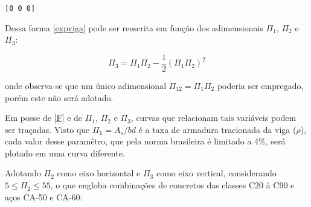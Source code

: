     \begin{Verbatim}[commandchars=\\\{\}]
[0 0 0]
    \end{Verbatim}

    Dessa forma \ref{expviga} pode ser reescrita em função dos adimensionais
\(\Pi_1\), \(\Pi_2\) e \(\Pi_3\):

\begin{equation}
\Pi_3=\Pi_1\Pi_2-\frac{1}{2}(\Pi_1\Pi_2)^2
\label{F}
\end{equation}

onde observa-se que um único adimensional \(\Pi_{12} = \Pi_1\Pi_2\)
poderia ser empregado, porém este não será adotado.

    Em posse de \ref{F} e de \(\Pi_1\), \(\Pi_2\) e \(\Pi_3\), curvas que
relacionam tais variáveis podem ser traçadas. Visto que \(\Pi_1=A_s/bd\)
é a taxa de armadura tracionada da viga (\(\rho\)), cada valor desse
paramêtro, que pela norma brasileira é limitado a 4\%, será plotado em
uma curva diferente.

Adotando \(\Pi_2\) como eixo horizontal e \(\Pi_3\) como eixo vertical,
considerando \(5 \le \Pi_2 \le 55\), o que engloba combinações de concretos
das classes C20 à C90 e aços CA-50 e CA-60:

